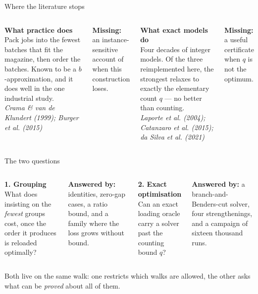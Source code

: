 
\begin{frame}{Where the literature stops}
\vspace{0.2cm}
\begin{columns}[T,onlytextwidth]
\textbf{What practice does}\\[.18cm]
Pack jobs into the fewest batches that fit the magazine, then order the batches. Known to
be a $b$-approximation, and it does well in the one industrial study.\\[.22cm]
{\small{\itshape\color{muted}Crama \& van de Klundert (1999); Burger et al. (2015)}}

\vspace{0.28cm}
\textbf{Missing:} an instance-sensitive account of when this construction loses.

\textbf{What exact models do}\\[.18cm]
Four decades of integer models. Of the three reimplemented here, the strongest relaxes to
exactly the elementary count $q$ --- no better than counting.\\[.22cm]
{\small{\itshape\color{muted}Laporte et al. (2004); Catanzaro et al. (2015); da Silva et al. (2021)}}

\vspace{0.28cm}
\textbf{Missing:} a useful certificate when $q$ is not the optimum.
\end{columns}
\end{frame}

\begin{frame}{The two questions}
\vspace{0.3cm}
\begin{columns}[T,onlytextwidth]
\textbf{1. Grouping}\\[.2cm]
What does insisting on the \emph{fewest} groups cost, once the order it produces is
reloaded optimally?

\vspace{0.4cm}
\textbf{Answered by:} identities, zero-gap cases, a ratio bound, and a family where the
loss grows without bound.

\textbf{2. Exact optimisation}\\[.2cm]
Can an exact loading oracle carry a solver past the counting bound $q$?

\vspace{0.4cm}
\textbf{Answered by:} a branch-and-Benders-cut solver, four strengthenings, and a campaign
of sixteen thousand runs.
\end{columns}
\vspace{0.5cm}
\centering
Both live on the same walk: one restricts which walks are allowed, the other asks what can
be \emph{proved} about all of them.
\end{frame}

